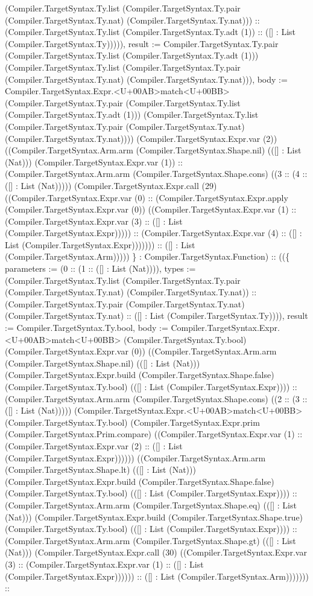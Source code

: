 \documentclass[11pt]{article}
\begin{document}
(Compiler.TargetSyntax.Ty.list (Compiler.TargetSyntax.Ty.pair (Compiler.TargetSyntax.Ty.nat) (Compiler.TargetSyntax.Ty.nat))) :: (Compiler.TargetSyntax.Ty.list (Compiler.TargetSyntax.Ty.adt (1)) :: ([] : List (Compiler.TargetSyntax.Ty))))), result := Compiler.TargetSyntax.Ty.pair (Compiler.TargetSyntax.Ty.list (Compiler.TargetSyntax.Ty.adt (1))) (Compiler.TargetSyntax.Ty.list (Compiler.TargetSyntax.Ty.pair (Compiler.TargetSyntax.Ty.nat) (Compiler.TargetSyntax.Ty.nat))), body := Compiler.TargetSyntax.Expr.<U+00AB>match<U+00BB> (Compiler.TargetSyntax.Ty.pair (Compiler.TargetSyntax.Ty.list (Compiler.TargetSyntax.Ty.adt (1))) (Compiler.TargetSyntax.Ty.list (Compiler.TargetSyntax.Ty.pair (Compiler.TargetSyntax.Ty.nat) (Compiler.TargetSyntax.Ty.nat)))) (Compiler.TargetSyntax.Expr.var (2)) ((Compiler.TargetSyntax.Arm.arm (Compiler.TargetSyntax.Shape.nil) (([] : List (Nat))) (Compiler.TargetSyntax.Expr.var (1)) :: (Compiler.TargetSyntax.Arm.arm (Compiler.TargetSyntax.Shape.cons) ((3 :: (4 :: ([] : List (Nat))))) (Compiler.TargetSyntax.Expr.call (29) ((Compiler.TargetSyntax.Expr.var (0) :: (Compiler.TargetSyntax.Expr.apply (Compiler.TargetSyntax.Expr.var (0)) ((Compiler.TargetSyntax.Expr.var (1) :: (Compiler.TargetSyntax.Expr.var (3) :: ([] : List (Compiler.TargetSyntax.Expr))))) :: (Compiler.TargetSyntax.Expr.var (4) :: ([] : List (Compiler.TargetSyntax.Expr))))))) :: ([] : List (Compiler.TargetSyntax.Arm))))) \} : Compiler.TargetSyntax.Function) :: ((\{ parameters := (0 :: (1 :: ([] : List (Nat)))), types := (Compiler.TargetSyntax.Ty.list (Compiler.TargetSyntax.Ty.pair (Compiler.TargetSyntax.Ty.nat) (Compiler.TargetSyntax.Ty.nat)) :: (Compiler.TargetSyntax.Ty.pair (Compiler.TargetSyntax.Ty.nat) (Compiler.TargetSyntax.Ty.nat) :: ([] : List (Compiler.TargetSyntax.Ty)))), result := Compiler.TargetSyntax.Ty.bool, body := Compiler.TargetSyntax.Expr.<U+00AB>match<U+00BB> (Compiler.TargetSyntax.Ty.bool) (Compiler.TargetSyntax.Expr.var (0)) ((Compiler.TargetSyntax.Arm.arm (Compiler.TargetSyntax.Shape.nil) (([] : List (Nat))) (Compiler.TargetSyntax.Expr.build (Compiler.TargetSyntax.Shape.false) (Compiler.TargetSyntax.Ty.bool) (([] : List (Compiler.TargetSyntax.Expr)))) :: (Compiler.TargetSyntax.Arm.arm (Compiler.TargetSyntax.Shape.cons) ((2 :: (3 :: ([] : List (Nat))))) (Compiler.TargetSyntax.Expr.<U+00AB>match<U+00BB> (Compiler.TargetSyntax.Ty.bool) (Compiler.TargetSyntax.Expr.prim (Compiler.TargetSyntax.Prim.compare) ((Compiler.TargetSyntax.Expr.var (1) :: (Compiler.TargetSyntax.Expr.var (2) :: ([] : List (Compiler.TargetSyntax.Expr)))))) ((Compiler.TargetSyntax.Arm.arm (Compiler.TargetSyntax.Shape.lt) (([] : List (Nat))) (Compiler.TargetSyntax.Expr.build (Compiler.TargetSyntax.Shape.false) (Compiler.TargetSyntax.Ty.bool) (([] : List (Compiler.TargetSyntax.Expr)))) :: (Compiler.TargetSyntax.Arm.arm (Compiler.TargetSyntax.Shape.eq) (([] : List (Nat))) (Compiler.TargetSyntax.Expr.build (Compiler.TargetSyntax.Shape.true) (Compiler.TargetSyntax.Ty.bool) (([] : List (Compiler.TargetSyntax.Expr)))) :: (Compiler.TargetSyntax.Arm.arm (Compiler.TargetSyntax.Shape.gt) (([] : List (Nat))) (Compiler.TargetSyntax.Expr.call (30) ((Compiler.TargetSyntax.Expr.var (3) :: (Compiler.TargetSyntax.Expr.var (1) :: ([] : List (Compiler.TargetSyntax.Expr)))))) :: ([] : List (Compiler.TargetSyntax.Arm))))))) :: 
\end{document}
